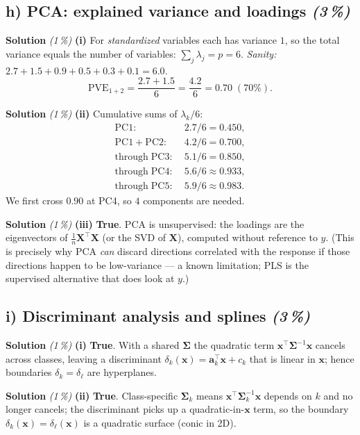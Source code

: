 \documentclass[11pt,a4paper]{article}
\newcommand{\subpoints}[1]{\textit{(#1\,\%)}}
\newcommand{\sol}{\noindent\textbf{Solution}}
\begin{document}
\subsection*{h) PCA: explained variance and loadings \subpoints{3}}

\sol{} \subpoints{1} \textbf{(i)} For \emph{standardized} variables each has variance $1$, so the
total variance equals the number of variables: $\sum_j \lambda_j = p = \boxed{6}$.
\emph{Sanity:} $2.7+1.5+0.9+0.5+0.3+0.1 = 6.0$. \checkmark
$$\mathrm{PVE}_{1+2} = \frac{2.7 + 1.5}{6} = \frac{4.2}{6} = \boxed{0.70}\;(70\%).$$

\medskip
\sol{} \subpoints{1} \textbf{(ii)} Cumulative sums of $\lambda_k/6$:
\begin{align*}
\mathrm{PC1}\!:\; & 2.7/6 = 0.450, \\
\mathrm{PC1\!+\!PC2}\!:\; & 4.2/6 = 0.700, \\
\mathrm{through\;PC3}\!:\; & 5.1/6 = 0.850, \\
\mathrm{through\;PC4}\!:\; & 5.6/6 \approx 0.933, \\
\mathrm{through\;PC5}\!:\; & 5.9/6 \approx 0.983.
\end{align*}
We first cross $0.90$ at PC4, so $\boxed{4}$ components are needed.

\medskip
\sol{} \subpoints{1} \textbf{(iii)} \textbf{True}. PCA is unsupervised: the loadings are the
eigenvectors of $\tfrac{1}{n}\mathbf X^\top \mathbf X$ (or the SVD of $\mathbf X$), computed
without reference to $y$. (This is precisely why PCA \emph{can} discard directions correlated with
the response if those directions happen to be low-variance --- a known limitation; PLS is the
supervised alternative that does look at $y$.)

\subsection*{i) Discriminant analysis and splines \subpoints{3}}

\sol{} \subpoints{1} \textbf{(i)} \textbf{True}. With a shared $\boldsymbol\Sigma$ the quadratic
term $\mathbf x^\top \boldsymbol\Sigma^{-1}\mathbf x$ cancels across classes, leaving a
discriminant $\delta_k(\mathbf x) = \mathbf a_k^\top\mathbf x + c_k$ that is linear in $\mathbf x$;
hence boundaries $\delta_k = \delta_\ell$ are hyperplanes.

\medskip
\sol{} \subpoints{1} \textbf{(ii)} \textbf{True}. Class-specific $\boldsymbol\Sigma_k$ means
$\mathbf x^\top\boldsymbol\Sigma_k^{-1}\mathbf x$ depends on $k$ and no longer cancels; the
discriminant picks up a quadratic-in-$\mathbf x$ term, so the boundary
$\delta_k(\mathbf x) = \delta_\ell(\mathbf x)$ is a quadratic surface (conic in 2D).
\end{document}
